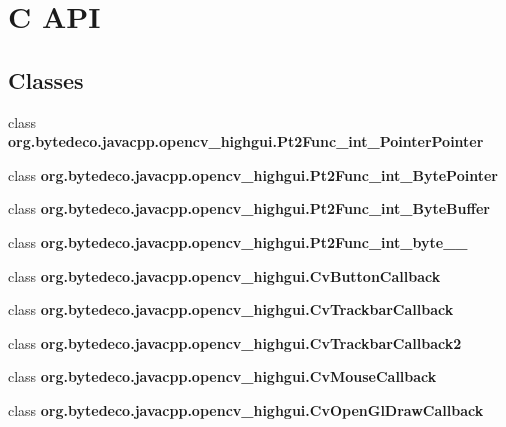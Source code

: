 \hypertarget{group__highgui__c}{}\section{C A\+PI}
\label{group__highgui__c}
\subsection*{Classes}
\begin{DoxyCompactItemize}
\item 
class {\bfseries org.\+bytedeco.\+javacpp.\+opencv\+\_\+highgui.\+Pt2\+Func\+\_\+int\+\_\+\+Pointer\+Pointer}
\item 
class {\bfseries org.\+bytedeco.\+javacpp.\+opencv\+\_\+highgui.\+Pt2\+Func\+\_\+int\+\_\+\+Byte\+Pointer}
\item 
class {\bfseries org.\+bytedeco.\+javacpp.\+opencv\+\_\+highgui.\+Pt2\+Func\+\_\+int\+\_\+\+Byte\+Buffer}
\item 
class {\bfseries org.\+bytedeco.\+javacpp.\+opencv\+\_\+highgui.\+Pt2\+Func\+\_\+int\+\_\+byte\+\_\+\+\_\+}
\item 
class {\bfseries org.\+bytedeco.\+javacpp.\+opencv\+\_\+highgui.\+Cv\+Button\+Callback}
\item 
class {\bfseries org.\+bytedeco.\+javacpp.\+opencv\+\_\+highgui.\+Cv\+Trackbar\+Callback}
\item 
class {\bfseries org.\+bytedeco.\+javacpp.\+opencv\+\_\+highgui.\+Cv\+Trackbar\+Callback2}
\item 
class {\bfseries org.\+bytedeco.\+javacpp.\+opencv\+\_\+highgui.\+Cv\+Mouse\+Callback}
\item 
class {\bfseries org.\+bytedeco.\+javacpp.\+opencv\+\_\+highgui.\+Cv\+Open\+Gl\+Draw\+Callback}
\end{DoxyCompactItemize}
